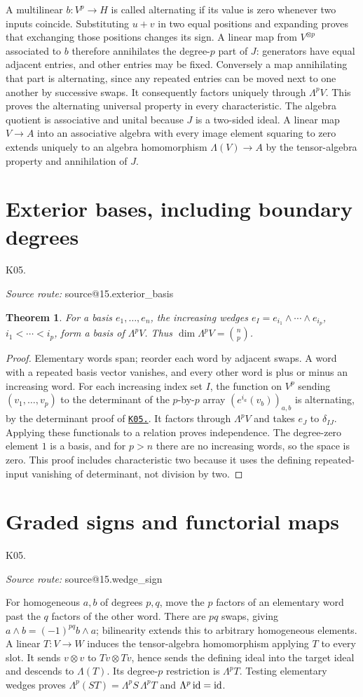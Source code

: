 \documentclass[11pt,a4paper]{book}
\makeatletter
\newtheorem{theorem}{Theorem}[chapter]
\theoremstyle{definition}\newtheorem{definition}[theorem]{Definition}
\theoremstyle{remark}\newtheorem{remark}[theorem]{Remark}
\newcommand{\kref}[1]{\hyperref[k:#1]{\texttt{K05.\detokenize{#1}}}}
\newcommand{\Kentry}[2]{\section{#2}\label{k:#1}\noindent\textsf{\small K05.\detokenize{#1}}\par
  \begingroup\small\color{black!65}\textit{Source route: }\csname source@#1\endcsname\par\endgroup}
\makeatother
\begin{document}
A multilinear $b:V^p\to H$ is called alternating if its value is zero whenever two inputs coincide. Substituting $u+v$ in two equal positions and expanding proves that exchanging those positions changes its sign. A linear map from $V^{\otimes p}$ associated to $b$ therefore annihilates the degree-$p$ part of $J$: generators have equal adjacent entries, and other entries may be fixed. Conversely a map annihilating that part is alternating, since any repeated entries can be moved next to one another by successive swaps. It consequently factors uniquely through $\Lambda^p V$. This proves the alternating universal property in every characteristic. The algebra quotient is associative and unital because $J$ is a two-sided ideal. A linear map $V\to A$ into an associative algebra with every image element squaring to zero extends uniquely to an algebra homomorphism $\Lambda(V)\to A$ by the tensor-algebra property and annihilation of $J$.

\Kentry{15.exterior_basis}{Exterior bases, including boundary degrees}
\begin{theorem}
For a basis $e_1,\ldots,e_n$, the increasing wedges $e_I=e_{i_1}\wedge\cdots\wedge e_{i_p}$, $i_1<\cdots<i_p$, form a basis of $\Lambda^pV$. Thus $\dim\Lambda^pV=\binom np$.
\end{theorem}
\begin{proof}
Elementary words span; reorder each word by adjacent swaps. A word with a repeated basis vector vanishes, and every other word is plus or minus an increasing word. For each increasing index set $I$, the function on $V^p$ sending $(v_1,\ldots,v_p)$ to the determinant of the $p$-by-$p$ array $(e^{i_a}(v_b))_{a,b}$ is alternating, by the determinant proof of \kref{05.det_uniqueness}. It factors through $\Lambda^pV$ and takes $e_J$ to $\delta_{IJ}$. Applying these functionals to a relation proves independence. The degree-zero element $1$ is a basis, and for $p>n$ there are no increasing words, so the space is zero. This proof includes characteristic two because it uses the defining repeated-input vanishing of determinant, not division by two.
\end{proof}

\Kentry{15.wedge_sign}{Graded signs and functorial maps}
For homogeneous $a,b$ of degrees $p,q$, move the $p$ factors of an elementary word past the $q$ factors of the other word. There are $pq$ swaps, giving $a\wedge b=(-1)^{pq}b\wedge a$; bilinearity extends this to arbitrary homogeneous elements. A linear $T:V\to W$ induces the tensor-algebra homomorphism applying $T$ to every slot. It sends $v\otimes v$ to $Tv\otimes Tv$, hence sends the defining ideal into the target ideal and descends to $\Lambda(T)$. Its degree-$p$ restriction is $\Lambda^pT$. Testing elementary wedges proves $\Lambda^p(ST)=\Lambda^pS\,\Lambda^pT$ and $\Lambda^p\operatorname{id}=\operatorname{id}$.
\end{document}
